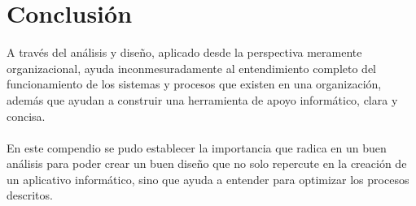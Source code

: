 \chapter*{Conclusi\'on}
A trav\'es del an\'alisis y dise\~no, aplicado desde la perspectiva meramente organizacional, ayuda inconmesuradamente al entendimiento completo del funcionamiento de los sistemas y procesos que existen en una organizaci\'on, adem\'as que ayudan a construir una herramienta de apoyo inform\'atico, clara y concisa.%
\\%
\\%
En este compendio se pudo establecer la importancia que radica en un buen an\'alisis para poder crear un buen dise\~no que no solo repercute en la creaci\'on de un aplicativo inform\'atico, sino que ayuda a entender para optimizar los procesos descritos.%
